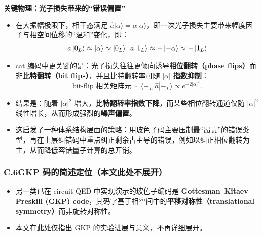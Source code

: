 \documentclass[12pt,a4paper,oneside]{ctexbook}
\begin{document}
\noindent\textbf{关键物理：光子损失带来的“错误偏置”}

\begin{itemize}
  \item 在大振幅极限下，相干态满足 $\hat a|\alpha\rangle=\alpha|\alpha\rangle$，即一次光子损失主要带来幅度因子与相空间位移的“温和”变化，即：
  $$a\ket{0_L} \approx \ket{\alpha} \approx \ket{0_L} \,\, \, a\ket{1_L} \approx - \ket{-\alpha} \approx -\ket{1_L}$$
  \item cat 编码中更关键的是：光子损失往往更倾向诱导\textbf{相位翻转（phase flips）}而非\textbf{比特翻转（bit flips）}，并且比特翻转率可随 $|\alpha|$ \textbf{指数抑制}：
  \[
    \text{bit-flip 相关矩阵元} \sim \langle +_L|\hat a|-_L\rangle \propto e^{-2|\alpha|^2}.
  \]
  \item 结果是：随着 $|\alpha|^2$ 增大，\textbf{比特翻转率指数下降}，而某些相位翻转通道仅随 $|\alpha|^2$ 线性增长，从而形成强烈的\textbf{噪声偏置}。
  \item 这启发了一种体系结构层面的策略：用玻色子码主要压制最“昂贵”的错误类型，再在上层纠错码中重点纠正剩余占主导的错误，例如以纠正相位翻转为主，从而降低容错量子计算的总开销。
\end{itemize}

\subsubsection{C.6\quad GKP 码的简述定位（本文此处不展开）}

\begin{itemize}
  \item 另一类已在 circuit QED 中实现演示的玻色子编码是 \textbf{Gottesman--Kitaev--Preskill (GKP) code}，其码字基于相空间中的\textbf{平移对称性（translational symmetry）}而非旋转对称性。
  \item 本文在此处仅指出 GKP 的实验进展与意义，不再详细展开。
\end{itemize}
\end{document}
